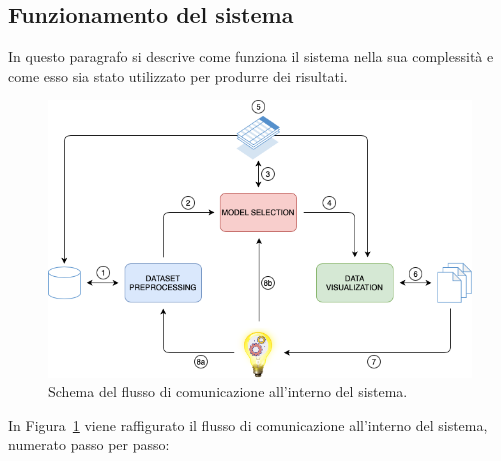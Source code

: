 \documentclass[12pt]{report}
\theoremstyle{definition}
\begin{document}
\subsection{Funzionamento del sistema}
In questo paragrafo si descrive come funziona il sistema nella sua complessità e come esso sia stato utilizzato per produrre dei risultati.
\begin{figure}[!ht]
    \centering
    \includegraphics[scale=0.6]{images/cycle.png}
    \caption{Schema del flusso di comunicazione all'interno del sistema.}
    \label{cycle}
\end{figure}
In Figura~\ref{cycle} viene raffigurato il flusso di comunicazione all'interno del sistema, numerato passo per passo: 
\end{document}
